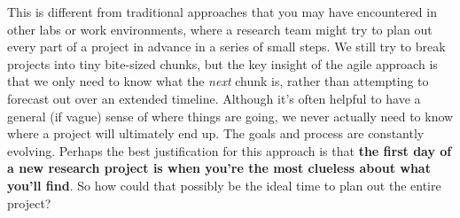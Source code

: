 \documentclass{tufte-book} %
\begin{document}
This is different from traditional approaches that you may have
encountered in other labs or work environments, where a research team
might try to plan out every part of a project in advance in a series
of small steps.  We still try to break projects into tiny bite-sized
chunks, but the key insight of the agile approach is that we only need
to know what the \textit{next} chunk is, rather than attempting to
forecast out over an extended timeline.  Although it's often helpful
to have a general (if vague) sense of where things are going, we never
actually need to know where a project will ultimately end up.  The
goals and process are constantly evolving.  Perhaps the best
justification for this approach is that \textbf{the first day of a new
  research project is when you're the most clueless about what you'll
  find}.  So how could that possibly be the ideal time to plan out the
entire project?
\end{document}
